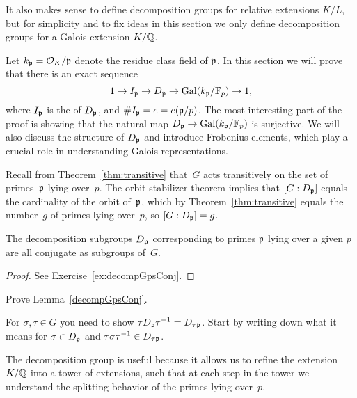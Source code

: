 It also makes sense to define decomposition groups for relative
extensions $K/L$, but for simplicity and to fix ideas in this section
we only define decomposition groups for a Galois extension $K/\mathbb{Q}$.

Let $k_{\mathfrak{p}} = \mathcal{O}_K/\mathfrak{p}$ denote the residue class field of $\mathfrak{p}$.
In this section we will prove that there is an exact sequence
$$
	1\to I_{\mathfrak{p}} \to D_{\mathfrak{p}} \to \operatorname{Gal}(k_{\mathfrak{p}}/\mathbb{F}_p)\to 1,
$$
where $I_{\mathfrak{p}}$ is the  of $D_{\mathfrak{p}}$, and
$\#I_{\mathfrak{p}}=e = e(\mathfrak{p}/p)$.
The most interesting part of the proof is
showing that the natural map $D_{\mathfrak{p}}\to  \operatorname{Gal}(k_{\mathfrak{p}}/\mathbb{F}_p)$
is surjective. We will also discuss the structure of $D_{\mathfrak{p}}$ and introduce
Frobenius elements, which play a crucial role in understanding Galois
representations.


Recall from Theorem~\ref{thm:transitive}
that~$G$ acts transitively on the set of primes~$\mathfrak{p}$ lying
over~$p$.  The orbit-stabilizer theorem implies that $[G:D_{\mathfrak{p}}]$ equals the cardinality of the
orbit of~$\mathfrak{p}$, which by Theorem~\ref{thm:transitive}
equals the number~$g$ of primes lying over~$p$, so $[G:D_{\mathfrak{p}}]=g$.

\begin{lemma}\label{decompGpsConj}
	The decomposition subgroups $D_{\mathfrak{p}}$ corresponding to primes $\mathfrak{p}$
	lying over a given $p$ are all conjugate as subgroups of~$G$.
\end{lemma}
\begin{proof}
	See Exercise~\ref{ex:decompGpsConj}.
\end{proof}

\begin{exercise}\label{ex:decompGpsConj}
	Prove Lemma~\ref{decompGpsConj}.

	\begin{hint}
		For $\sigma,\tau\in G$ you need to show
		$\tau D_{\mathfrak{p}} \tau^{-1} = D_{\tau\mathfrak{p}}$.
		Start by writing down what it means for $\sigma\in D_{\mathfrak{p}}$
		and $\tau\sigma\tau^{-1}\in D_{\tau\mathfrak{p}}$.
	\end{hint}
\end{exercise}

The decomposition group is useful because it allows us
to refine the extension $K/\mathbb{Q}$ into a tower of extensions, such that at
each step in the tower we understand the splitting behavior
of the primes lying over~$p$.


